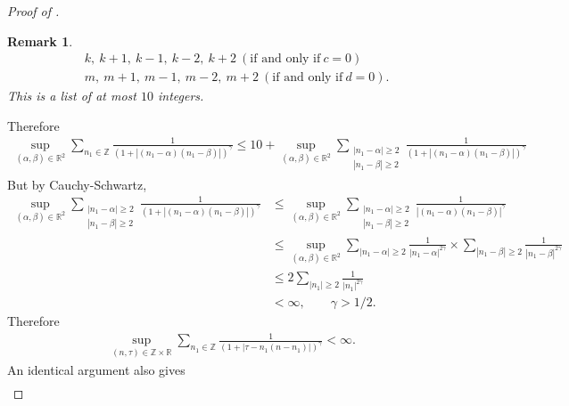 \documentclass[12pt,reqno]{amsart}
\numberwithin{equation}{section}  %
\renewcommand{\cref}{\Cref}
\newcommand{\rr}{\mathbb{R}}
\newcommand{\zz}{\mathbb{Z}}
\newtheorem{remark}[theorem]{Remark}
\begin{document}
\begin{appendices}
\begin{proof}[Proof of \cref{lem:sum-estimate}]
\begin{framed}
\begin{remark}
\begin{equation*}
\begin{split}
  &  k, \ k+1, \ k-1,
  \ k-2,  \ k+2 \ (\text{if and only if} \ c=0)
  \\
  &  m,  \ m+1, \ m-1,
  \ m-2,  \ m+2 \ (\text{if and only if} \ d=0).
\end{split}
\end{equation*}
%
%
%
%
This is a list of at most $10$ integers.
\label{rem:pf-counting}
\end{remark}
\end{framed}
%
Therefore
%
%
%
%
\begin{equation*}
\begin{split}
\sup_{(\alpha, \beta )\in \mathbb{R}^{2}}\sum_{n_1\in \zz}\frac{1}{(1 +
|(n_{1} - \alpha)(n_{1} - \beta)|)^{\gamma}} \le 10 +
\sup_{(\alpha, \beta )\in \mathbb{R}^{2}}\sum_{\substack{|n_1 - \alpha| \ge 2 \\
| n_{1} - \beta  | \ge 2}}\frac{1}{(1 +
|(n_{1} - \alpha)(n_{1} - \beta)|)^{\gamma}} 
\end{split}
\end{equation*}
But by Cauchy-Schwartz,
%
%
\begin{equation*}
\begin{split}
\sup_{(\alpha, \beta )\in \mathbb{R}^{2}}\sum_{\substack{|n_1 - \alpha| \ge 2 \\
| n_{1} - \beta  | \ge 2}}\frac{1}{(1 +
|(n_{1} - \alpha)(n_{1} - \beta)|)^{\gamma}}
& \le 
\sup_{(\alpha, \beta )\in \mathbb{R}^{2}}\sum_{\substack{|n_1 - \alpha| \ge 2 \\
| n_{1} - \beta  | \ge 2}}\frac{1}{|(n_{1} - \alpha)(n_{1} - \beta)|^{\gamma}} 
\\
& \le \sup_{(\alpha, \beta )\in \mathbb{R}^{2}}\sum_{|n_1 - \alpha|
\ge 2}\frac{1}{|n_{1} - \alpha|^{2\gamma}} \times \sum_{|n_1 - \beta|
\ge 2}\frac{1}{|n_{1} - \beta|^{2\gamma}} 
\\
& \le 2 \sum_{|n_1 |
\ge 2}\frac{1}{|n_{1} |^{2\gamma}}
\\
& < \infty, \qquad \gamma > 1/2.
\end{split}
\end{equation*}
%
Therefore
%
\begin{equation*}
\begin{split}
\sup_{(n,\tau)\in \zz \times \rr}\sum_{n_1\in \zz}\frac{1}{(1+|\tau-
n_1(n-n_1)|)^{\gamma}} < \infty.
\end{split}
\end{equation*}
An identical argument also gives
\begin{equation*}
\begin{split}

\end{split}
\end{equation*}
\end{proof}
\end{appendices}
\end{document}
